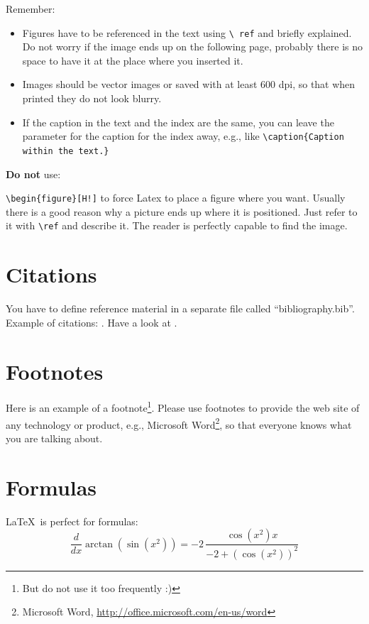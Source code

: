 Remember: 

\begin{itemize}
  \item Figures have to be referenced in the text using \texttt{\textbackslash
  ref} and briefly explained. Do not worry if the image ends up on the following
  page, probably there is no space to have it at the place where you inserted
  it. 
  \item Images should be vector images or saved with at least 600 dpi, so that
  when printed they do not look blurry.
  \item If the caption in the text and the index are the same, you can leave the
  parameter for the caption for the index away, e.g., like
  \texttt{\textbackslash caption\{Caption within the text.\}}
\end{itemize}

\textbf{Do not} use:

\begin{tight_enumerate}
  \item \texttt{\textbackslash begin\{figure\}[H!]} to force Latex to place a
  figure where you want. Usually there is a good reason why a picture ends up
  where it is positioned. Just refer to it with \texttt{\textbackslash ref} and
  describe it. The reader is perfectly capable to find the image.
\end{tight_enumerate}

\section{Citations}
You have to define reference material in a separate file called
``bibliography.bib''. Example of citations:
\cite{Bass2012,Rubin2014,Dictionary1}. Have a look at \cite{rfc6824}.

\section{Footnotes}
Here is an example of a footnote\footnote{But do not use it too frequently :)}.
Please use footnotes to provide the web site of any technology or product, e.g.,
Microsoft Word\footnote{Microsoft Word,
\url{http://office.microsoft.com/en-us/word}}, so that everyone knows what you
are talking about.

\section{Formulas}
\LaTeX~is perfect for formulas: 
\begin{equation}
	\label{equ:formula1}
	{\frac {d}{dx}}\arctan(\sin({x}^{2}))=-2\,{\frac {\cos({x}^{2})x}{-2+\left (\cos({x}^{2})\right )^{2}}}
\end{equation}

